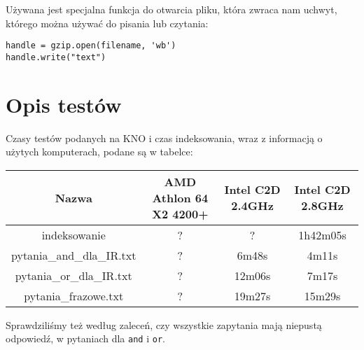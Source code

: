 \documentclass[11pt]{article}
\begin{document}
Używana jest specjalna funkcja do otwarcia pliku, która zwraca nam uchwyt, którego można używać do pisania lub czytania:
\begin{verbatim}
handle = gzip.open(filename, 'wb') 
handle.write("text")
\end{verbatim}

\section{Opis testów}
Czasy testów podanych na KNO i czas indeksowania, wraz z informacją o użytych komputerach, podane są w tabelce:
\begin{center}
\begin{tabular}{|c|c|c|c|}
\hline
Nazwa & AMD Athlon 64 X2 4200+ & Intel C2D 2.4GHz & Intel C2D 2.8GHz \\ \hline
indeksowanie & ? & ? & 1h42m05s \\ \hline
pytania\_and\_dla\_IR.txt & ? & 6m48s & 4m11s \\ \hline
pytania\_or\_dla\_IR.txt & ? & 12m06s & 7m17s \\ \hline
pytania\_frazowe.txt & ? & 19m27s & 15m29s \\ \hline
\end{tabular}
\end{center}

Sprawdziliśmy też według zaleceń, czy wszystkie zapytania mają niepustą odpowiedź, w pytaniach dla \texttt{and} i \texttt{or}.
\end{document}
